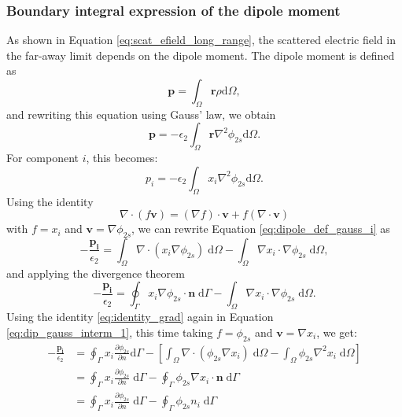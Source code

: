 \subsubsection{Boundary integral expression of the dipole moment}

As shown in Equation \eqref{eq:scat_efield_long_range}, the scattered electric 
field in the far-away limit depends on the dipole moment. The dipole moment is 
defined as 
%
\begin{equation} \label{eq:dipole_def}
\mathbf{p} = \int_\Omega \mathbf{r} \rho \text{d}\Omega,
\end{equation}
%
and rewriting this equation using Gauss' law, we obtain
%
\begin{equation} \label{eq:dipole_def_gauss}
\mathbf{p} = -\epsilon_2\int_\Omega \mathbf{r} \nabla^2 \phi_{2s} \text{d}\Omega.
\end{equation}
%
For component $i$, this becomes:
%
\begin{equation} \label{eq:dipole_def_gauss_i}
{p_i} = -\epsilon_2\int_\Omega {x_i} \nabla^2 \phi_{2s} \text{d}\Omega.
\end{equation}
%
Using the identity
%
\begin{equation} \label{eq:identity_grad}
  \nabla \cdot \left(f \mathbf{v}\right) = \left( \nabla f \right)\cdot \mathbf{v} + f\left(\nabla \cdot \mathbf{v}\right)
\end{equation}
%
with $f=x_i$ and $\mathbf{v} = \nabla\phi_{2s}$, we can rewrite Equation \eqref{eq:dipole_def_gauss_i}
as 
%
\begin{equation}
- \frac{\mathbf{p_i}}{\epsilon_2} = \int_\Omega \nabla \cdot \left( x_i \nabla \phi_{2s} \right) \; \text{d}\Omega - \int_\Omega \nabla x_i \cdot \nabla\phi_{2s} \; \text{d}\Omega, \nonumber 
\end{equation}
\noindent and applying the divergence theorem
\begin{equation} \label{eq:dip_gauss_interm_1}
- \frac{\mathbf{p_i}}{\epsilon_2}= \oint_\Gamma  x_i  \nabla \phi_{2s} \cdot \mathbf{n} \; \text{d}\Gamma - \int_\Omega \nabla x_i \cdot \nabla\phi_{2s} \; \text{d}\Omega.
\end{equation}
%
Using the identity \eqref{eq:identity_grad} again in Equation \eqref{eq:dip_gauss_interm_1}, this time 
taking $f=\phi_{2s}$ and $\mathbf{v} = \nabla x_i$, we get:
%
\begin{align} \label{eq:dip_gauss_interm_2}
 - \frac{\mathbf{p_i}}{\epsilon_2} &= \oint_\Gamma  x_i  \frac{\partial \phi_{2s}}{\partial n} \text{d}\Gamma - \left[ \int_\Omega \nabla \cdot \left( \phi_{2s} \nabla x_i \right)\;\text{d}\Omega - \int_\Omega  \phi_{2s} \nabla^2 x_i \;\text{d}\Omega\right] \nonumber\\
&= \oint_\Gamma  x_i  \frac{\partial \phi_{2s}}{\partial n} \; \text{d}\Gamma - \oint_\Gamma \phi_{2s} \nabla x_i \cdot \mathbf{n} \; \text{d}\Gamma \nonumber \\
&= \oint_\Gamma  x_i  \frac{\partial \phi_{2s}}{\partial n} \; \text{d}\Gamma - \oint_\Gamma \phi_{2s} n_i \;\text{d}\Gamma
\end{align}
